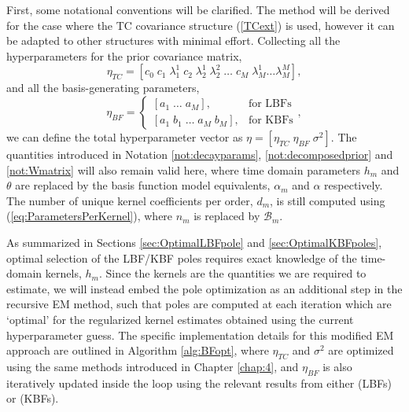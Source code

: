 First, some notational conventions will be clarified. The method will be derived for the case where the TC covariance structure (\ref{TCext}) is used, however it can be adapted to other structures with minimal effort. Collecting all the hyperparameters for the prior covariance matrix, $$\eta_{TC} = [c_0 \; c_1 \; \lambda_1^1 \; c_2 \; \lambda_2^1 \; \lambda_2^2 \; \hdots \; c_M \; \lambda_M^1 \hdots \lambda_M^M],$$ and all the basis-generating parameters, $$\eta_{BF} = \begin{cases} [a_1 \; \hdots \; a_M], & \text{for LBFs} \\ [a_1 \; b_1 \; \hdots \; a_M \; b_M], & \text{for KBFs}\end{cases},$$ we can define the total hyperparameter vector as $\eta = [\eta_{TC} \; \eta_{BF} \; \sigma^2]$. The quantities introduced in Notation \ref{not:decayparams}, \ref{not:decomposedprior} and \ref{not:Wmatrix} will also remain valid here, where time domain parameters $h_m$ and $\theta$ are replaced by the basis function model equivalents, $\alpha_m$ and $\alpha$ respectively. The number of unique kernel coefficients per order, $d_m$, is still computed using (\ref{eq:ParametersPerKernel}), where $n_m$ is replaced by $\mathcal{B}_m$.

As summarized in Sections \ref{sec:OptimalLBFpole} and \ref{sec:OptimalKBFpoles}, optimal selection of the LBF/KBF poles requires exact knowledge of the time-domain kernels, $h_m$. Since the kernels are the quantities we are required to estimate, we will instead embed the pole optimization as an additional step in the recursive EM method, such that poles are computed at each iteration which are `optimal' for the regularized kernel estimates obtained using the current hyperparameter guess. The specific implementation details for this modified EM approach are outlined in Algorithm \ref{alg:BFopt}, where $\eta_{TC}$ and $\sigma^2$ are optimized using the same methods introduced in Chapter \ref{chap:4}, and $\eta_{BF}$ is also iteratively updated inside the loop using the relevant results from either \cite{Campello2004} (LBFs) or \cite{Rosa2007} (KBFs). 

